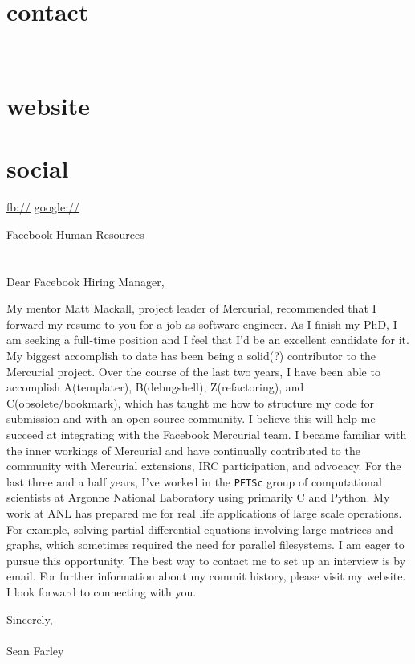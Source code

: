 \documentclass[]{fancy-cv}
\begin{document}

\begin{aside}
  \section{contact}
    \href{mailto:\myemail}{\myemail}
    ~
    \myphone
    ~
    \myaddress
    \mycity
  \section{website}
    \href{\mywebsite}{\mywebsite}
  \section{social}
    \href{http://facebook.com/\myfb}{fb://\myfb}
    \href{http://plug.google.com/\mygp}{google://\mygp}
\end{aside}

\vspace{.8em}
\large
Facebook Human Resources\\
\\
\\
Dear Facebook Hiring Manager,

My mentor Matt Mackall, project leader of Mercurial, recommended that I forward
my resume to you for a job as software engineer. As I finish my PhD, I am
seeking a full-time position and I feel that I'd be an excellent candidate for
it.
%
\newline\newline
%
My biggest accomplish to date has been being a solid(?) contributor to the
Mercurial project. Over the course of the last two years, I have been able to
accomplish A(templater), B(debugshell), Z(refactoring), and
C(obsolete/bookmark), which has taught me how to structure my code for
submission and with an open-source community. I believe this will help me
succeed at integrating with the Facebook Mercurial team. I became familiar with
the inner workings of Mercurial and have continually contributed to the
community with Mercurial extensions, IRC participation, and advocacy.
%
\newline\newline
%
For the last three and a half years, I've worked in the \texttt{PETSc} group of
computational scientists at Argonne National Laboratory using primarily C and
Python. My work at ANL has prepared me for real life applications of large
scale operations. For example, solving partial differential equations involving
large matrices and graphs, which sometimes required the need for parallel
filesystems.
%
\newline\newline
%
I am eager to pursue this opportunity. The best way to contact me to set up an
interview is by email. For further information about my commit history, please
visit my website. I look forward to connecting with you.

\vspace{2em}
Sincerely,\\
\\
Sean Farley
\end{document}
